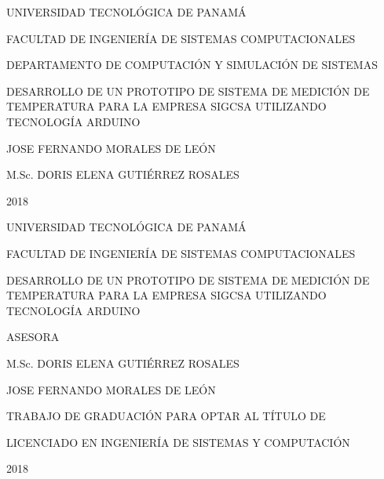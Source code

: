 \thispagestyle{empty}
\begin{center}
	
	UNIVERSIDAD TECNOLÓGICA DE PANAMÁ
	
	\vfill
	
	FACULTAD DE INGENIERÍA DE SISTEMAS COMPUTACIONALES
	
	\vfill
	
	DEPARTAMENTO DE COMPUTACIÓN Y SIMULACIÓN DE SISTEMAS
	
	\vfill
	
	DESARROLLO DE UN PROTOTIPO DE SISTEMA DE MEDICIÓN DE TEMPERATURA PARA LA EMPRESA SIGCSA UTILIZANDO TECNOLOGÍA ARDUINO
	
	\vfill
	
	JOSE FERNANDO MORALES DE LEÓN
	
	\vfill
	
	M.Sc. DORIS ELENA GUTIÉRREZ ROSALES
	
	\vfill
	
	2018
		
\end{center}
\clearpage

\thispagestyle{empty}

\begin{center}

	UNIVERSIDAD TECNOLÓGICA DE PANAMÁ
	
	\vfill
	
	FACULTAD DE INGENIERÍA DE SISTEMAS COMPUTACIONALES
	
	\vfill
	
	DESARROLLO DE UN PROTOTIPO DE SISTEMA DE MEDICIÓN DE TEMPERATURA PARA LA EMPRESA SIGCSA UTILIZANDO TECNOLOGÍA ARDUINO
	
	\vfill
	ASESORA\baselineskip
	
	M.Sc. DORIS ELENA GUTIÉRREZ ROSALES
	
	\vfill
	
	JOSE FERNANDO MORALES DE LEÓN
	
	\vfill
	
	TRABAJO DE GRADUACIÓN PARA OPTAR AL TÍTULO DE
	
	\vfill
	
	LICENCIADO EN INGENIERÍA DE SISTEMAS Y COMPUTACIÓN
	
	\vfill
	
	2018

\end{center}

\clearpage

\thispagestyle{plain}

